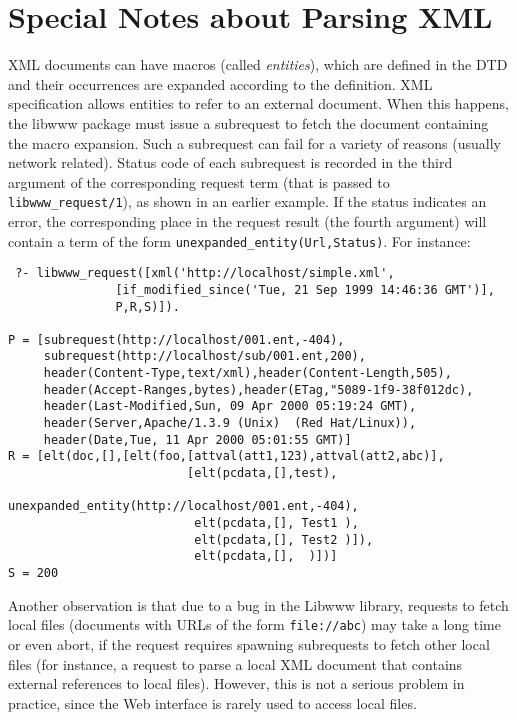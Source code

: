 \section{Special Notes about Parsing XML}

XML documents can have macros (called \emph{entities}), which are defined
in the DTD and their occurrences are expanded according to the definition.
XML specification allows entities to refer to an external document.
When this happens, the libwww package must issue a subrequest to fetch the
document containing the macro expansion. Such a subrequest can fail for a
variety of reasons (usually network related).
Status code of each subrequest is recorded in the third argument of the
corresponding request term (that is passed to {\tt libwww\_request/1}), as
shown in an earlier example. If the status indicates an error, the
corresponding place in the request result (the fourth argument) will
contain a term of the form {\tt unexpanded\_entity(Url,Status)}. For instance:
\begin{verbatim}
 ?- libwww_request([xml('http://localhost/simple.xml',
		       [if_modified_since('Tue, 21 Sep 1999 14:46:36 GMT')],
		       P,R,S)]).

P = [subrequest(http://localhost/001.ent,-404),
     subrequest(http://localhost/sub/001.ent,200),
     header(Content-Type,text/xml),header(Content-Length,505),
     header(Accept-Ranges,bytes),header(ETag,"5089-1f9-38f012dc),
     header(Last-Modified,Sun, 09 Apr 2000 05:19:24 GMT),
     header(Server,Apache/1.3.9 (Unix)  (Red Hat/Linux)),
     header(Date,Tue, 11 Apr 2000 05:01:55 GMT)]
R = [elt(doc,[],[elt(foo,[attval(att1,123),attval(att2,abc)],
                         [elt(pcdata,[],test),
                          unexpanded_entity(http://localhost/001.ent,-404),
                          elt(pcdata,[], Test1 ),
                          elt(pcdata,[], Test2 )]),
                          elt(pcdata,[],  )])]
S = 200
\end{verbatim}

Another observation is that due to a bug in the Libwww library,
requests to fetch local files (documents with URLs of the form 
{\tt file://abc}) may take a long time or even abort, if the request requires
spawning subrequests to fetch other local files (for instance, a request to
parse a local XML document that contains external references to local
files). However, this is not a serious problem in practice, since the Web
interface is rarely used to access local files.



